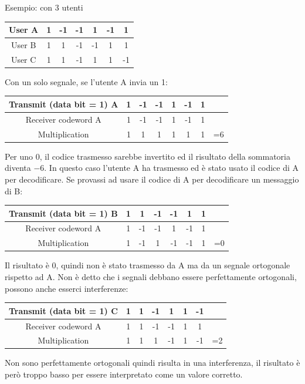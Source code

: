 Esempio: con 3 utenti
\begin{center}
	{
	\renewcommand{\arraystretch}{1.2}
	\begin{tabular}{|c|c|c|c|c|c|c|}
		\hline
		User A & 1 & -1 & -1 & 1 & -1 & 1 \\ 
		\hline
		User B & 1 & 1 & -1 & -1 & 1 & 1 \\ 
		\hline
		User C & 1 & 1 & -1 & 1 & 1 & -1 \\ 
		\hline
	\end{tabular}}
\end{center}
Con un solo segnale, se l'utente A invia un 1:
\begin{center}
	{
	\renewcommand{\arraystretch}{1.2}
	\begin{tabular}{|c|c|c|c|c|c|c|c|}
		\hline
		Transmit (data bit = 1) A & 1 & -1 & -1 & 1 & -1 & 1 & \\ 
		\hline
		Receiver codeword A & 1 & -1 & -1 & 1 & -1 & 1 & \\ 
		\hline
		Multiplication & 1 & 1 & 1 & 1 & 1 & 1 & =6 \\ 
		\hline
	\end{tabular}
	}
\end{center}
Per uno 0, il codice trasmesso sarebbe invertito ed il risultato della sommatoria diventa $-6$. In questo caso l'utente A ha trasmesso ed è stato usato il codice di A per decodificare. Se provassi ad usare il codice di A per decodificare un messaggio di B:
\begin{center}
	{
	\renewcommand{\arraystretch}{1.2}
	\begin{tabular}{|c|c|c|c|c|c|c|c|}
		\hline
		Transmit (data bit = 1) B & 1 & 1 & -1 & -1 & 1 & 1 & \\ 
		\hline
		Receiver codeword A & 1 & -1 & -1 & 1 & -1 & 1 & \\ 
		\hline
		Multiplication & 1 & -1 & 1 & -1 & -1 & 1 & =0 \\ 
		\hline
	\end{tabular}
	}
\end{center}

Il risultato è 0, quindi non è stato trasmesso da A ma da un segnale ortogonale rispetto ad A. Non è detto che i segnali debbano essere perfettamente ortogonali, possono anche esserci interferenze: 
\begin{center}
	{
		\renewcommand{\arraystretch}{1.2}
		\begin{tabular}{|c|c|c|c|c|c|c|c|}
			\hline
			Transmit (data bit = 1) C & 1 & 1 & -1 & 1 & 1 & -1 & \\ 
			\hline
			Receiver codeword A 	 & 1 & 1 & -1 & -1 & 1 & 1 & \\ 
			\hline
			Multiplication 					  & 1 & 1 & 1 & -1 & 1 & -1 & =2 \\ 
			\hline
		\end{tabular}
	}
\end{center}
Non sono perfettamente ortogonali quindi risulta in una interferenza, il risultato è però troppo basso per essere interpretato come un valore corretto.

